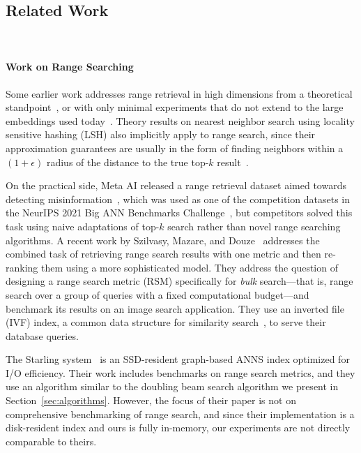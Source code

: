 \subsection{Related Work}~\label{sec:relatedwork}

\paragraph{Work on Range Searching} Some earlier work addresses range retrieval in high dimensions from a theoretical standpoint~\cite{chazelle2008approximate}, or with only minimal experiments that do not extend to the large embeddings used today~\cite{wang2013pltree}. Theory results on nearest neighbor search using locality sensitive hashing (LSH) also implicitly apply to range search, since their approximation guarantees are usually in the form of finding neighbors within a $(1+\epsilon)$ radius of the distance to the true top-$k$ result~\cite{indyk1998towards}.

On the practical side, Meta AI released a range retrieval dataset aimed towards detecting misinformation~\cite{simsearchnet}, which was used as one of the competition datasets in the NeurIPS 2021 Big ANN Benchmarks Challenge~\cite{simhadri2021results}, but competitors solved this task using naive adaptations of top-$k$ search rather than novel range searching algorithms. A recent work by Szilvasy, Mazare, and Douze~\cite{szilvasy2024vector} addresses the combined task of retrieving range search results with one metric and then re-ranking them using a more sophisticated model. They address the question of designing a range search metric (RSM) specifically for \textit{bulk} search---that is, range search over a group of queries with a fixed computational budget---and benchmark its results on an image search application. They use an inverted file (IVF) index, a common data structure for similarity search~\cite{douze2024faiss}, to serve their database queries. 

The Starling system~\cite{wang2024starling} is an SSD-resident graph-based ANNS index optimized for I/O efficiency. Their work includes benchmarks on range search metrics, and they use an algorithm similar to the doubling beam search algorithm we present in Section~\ref{sec:algorithms}. However, the focus of their paper is not on comprehensive benchmarking of range search, and since their implementation is a disk-resident index and ours is fully in-memory, our experiments are not directly comparable to theirs. 

